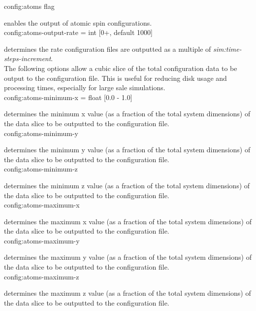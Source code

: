 {\zicf config:atoms flag} enables
the output of atomic spin configurations.\\

{\zicf config:atoms-output-rate = int [0+, default 1000]}
determines the rate configuration files are outputted as a multiple of \textit{sim:time-steps-increment}.\\

The following options allow a cubic slice of the total configuration data to
be output to the configuration file. This is useful for reducing disk usage and
processing times, especially for large sale simulations.\\

{\zicf config:atoms-minimum-x = float [0.0 - 1.0]}
determines the minimum x value (as a fraction of the total system dimensions)
of the data slice to be outputted to the configuration file.\\

{\zicf config:atoms-minimum-y}
determines the minimum y value (as a fraction of the total system dimensions)
of the data slice to be outputted to the configuration file.\\

{\zicf config:atoms-minimum-z}
determines the minimum z value (as a fraction of the total system dimensions)
of the data slice to be outputted to the configuration file.\\

{\zicf config:atoms-maximum-x}
determines the maximum x value (as a fraction of the total system dimensions)
of the data slice to be outputted to the configuration file.\\

{\zicf config:atoms-maximum-y}
determines the maximum y value (as a fraction of the total system dimensions)
of the data slice to be outputted to the configuration file.\\

{\zicf config:atoms-maximum-z}
determines the maximum z value (as a fraction of the total system dimensions)
of the data slice to be outputted to the configuration file.\\

